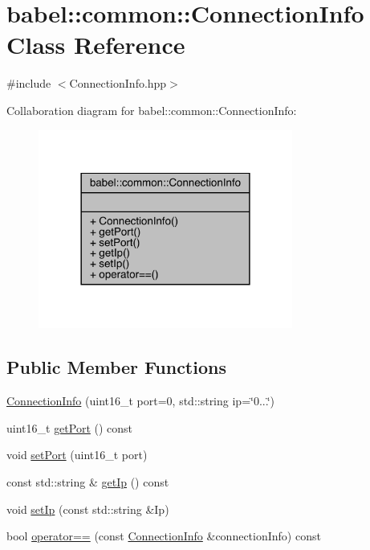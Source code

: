 \hypertarget{classbabel_1_1common_1_1_connection_info}{}\section{babel\+:\+:common\+:\+:Connection\+Info Class Reference}
\label{classbabel_1_1common_1_1_connection_info}


{\ttfamily \#include $<$Connection\+Info.\+hpp$>$}



Collaboration diagram for babel\+:\+:common\+:\+:Connection\+Info\+:\nopagebreak
\begin{figure}[H]
\begin{center}
\leavevmode
\includegraphics[width=237pt]{classbabel_1_1common_1_1_connection_info__coll__graph}
\end{center}
\end{figure}
\subsection*{Public Member Functions}
\begin{DoxyCompactItemize}
\item 
\mbox{\hyperlink{classbabel_1_1common_1_1_connection_info_a72b5b676e67bc2ea0bf42354b12e7843}{Connection\+Info}} (uint16\+\_\+t port=0, std\+::string ip=\char`\"{}0...\char`\"{})
\item 
uint16\+\_\+t \mbox{\hyperlink{classbabel_1_1common_1_1_connection_info_a2acb011dd3842a456d67a5a451351ac6}{get\+Port}} () const
\item 
void \mbox{\hyperlink{classbabel_1_1common_1_1_connection_info_ac7dbfe18e710762fbeccca1fe74e3647}{set\+Port}} (uint16\+\_\+t port)
\item 
const std\+::string \& \mbox{\hyperlink{classbabel_1_1common_1_1_connection_info_a218d1756c060abaaa9d2390f65031f66}{get\+Ip}} () const
\item 
void \mbox{\hyperlink{classbabel_1_1common_1_1_connection_info_af11940b8d1d611585ce9df5a0be16c67}{set\+Ip}} (const std\+::string \&Ip)
\item 
bool \mbox{\hyperlink{classbabel_1_1common_1_1_connection_info_a14e3781b12f38af2365f021b9b83fef8}{operator==}} (const \mbox{\hyperlink{classbabel_1_1common_1_1_connection_info}{Connection\+Info}} \&connection\+Info) const
\end{DoxyCompactItemize}


